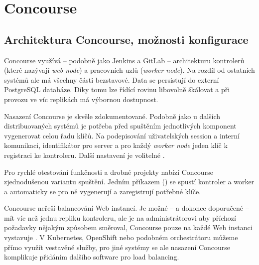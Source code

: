 \section{Concourse}


    \subsection{Architektura Concourse, možnosti konfigurace}
        Concourse využívá -- podobně jako Jenkins a GitLab -- architekturu kontrolerů (které nazývají \textit{web node}) a pracovních uzlů (\textit{worker node}). Na rozdíl od ostatních systémů ale má všechny části bezstavové. Data se persistují do externí PostgreSQL databáze. Díky tomu lze řídící rovinu libovolně škálovat a při provozu ve víc replikách má výbornou dostupnost.


        Nasazení Concourse je skvěle zdokumentované. Podobně jako u dalších distribuovaných systémů je potřeba před spuštěním jednotlivých komponent vygenerovat celou řadu klíčů. Na podepisování uživatelských session a interní komunikaci, identifikátor pro  server a pro každý \textit{worker node} jeden klíč k registraci ke kontroleru. Další nastavení je volitelné .

        Pro rychlé otestování funkčnosti a drobné projekty nabízí Concourse zjednodušenou variantu spuštění. Jedním příkazem () se spustí kontroler a worker a automaticky se pro ně vygenerují a zaregistrují potřebné klíče.

        Concourse neřeší balancování Web instancí. Je možné -- a dokonce doporučené -- mít víc než jednu repliku kontroleru, ale je na administrátorovi aby příchozí požadavky nějakým způsobem směroval, Concourse pouze na každé Web instanci vystavuje  . V Kubernetes, OpenShift nebo podobném orchestrátoru můžeme přímo využít vestavěné služby, pro jiné systémy se ale nasazení Concourse komplikuje přidáním dalšího software pro load balancing.

